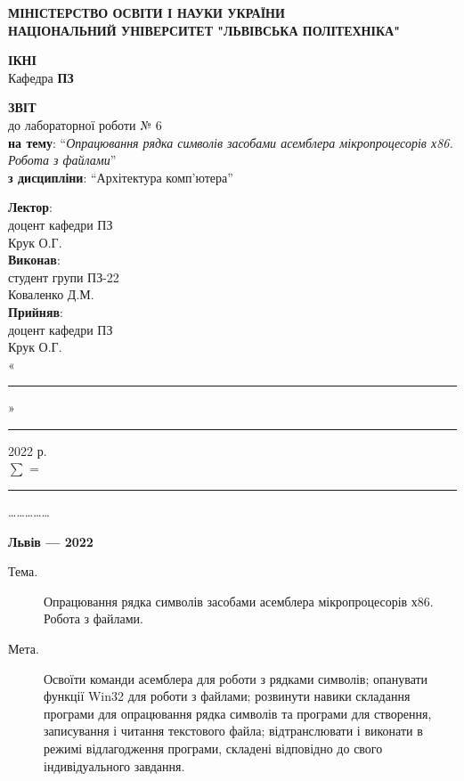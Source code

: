 \documentclass{article}
\newcommand\subject{Архітектура комп'ютера}
\newcommand\lecturer{доцент кафедри ПЗ\\Крук О.Г.}
\newcommand\teacher{доцент кафедри ПЗ\\Крук О.Г.}
\newcommand\mygroup{ПЗ-22}
\newcommand\lab{6}
\newcommand\theme{Опрацювання рядка символів засобами асемблера мікропроцесорів х86. Робота з файлами}
\newcommand\purpose{Освоїти команди асемблера для роботи з рядками символів; опанувати функції Win32 для роботи з файлами; розвинути навики складання програми для опрацювання рядка символів та програми для створення, записування і читання текстового файла; відтранслювати і виконати в режимі відлагодження програми, складені відповідно до свого індивідуального завдання}
\begin{document}
\begin{normalsize}
	\begin{titlepage}
		\thispagestyle{empty}
		\begin{center}
			\textbf{МІНІСТЕРСТВО ОСВІТИ І НАУКИ УКРАЇНИ\\
				НАЦІОНАЛЬНИЙ УНІВЕРСИТЕТ "ЛЬВІВСЬКА ПОЛІТЕХНІКА"}
		\end{center}
		\begin{flushright}
			\textbf{ІКНІ}\\
			Кафедра \textbf{ПЗ}
		\end{flushright}
		\vspace{200pt}
		\begin{center}
			\textbf{ЗВІТ}\\
			\vspace{10pt}
			до лабораторної роботи № \lab\\
			\textbf{на тему}: “\textit{\theme}”\\
			\textbf{з дисципліни}: “\subject”
		\end{center}
		\vspace{112pt}
		\begin{flushright}
			
			\textbf{Лектор}:\\
			\lecturer\\
			\vspace{28pt}
			\textbf{Виконав}:\\
			
			студент групи \mygroup\\
			Коваленко Д.М.\\
			\vspace{28pt}
			\textbf{Прийняв}:\\
			
			\teacher\\
			
			\vspace{28pt}
			«\rule{1cm}{0.15mm}» \rule{1.5cm}{0.15mm} 2022 р.\\
			$\sum$ = \rule{1cm}{0.15mm}……………\\
			
		\end{flushright}
		\vspace{\fill}
		\begin{center}
			\textbf{Львів — 2022}
		\end{center}
	\end{titlepage}
		
	\begin{description}
		\item[Тема.] \theme.
		\item[Мета.] \purpose.
	\end{description}


\end{normalsize}
\end{document}
